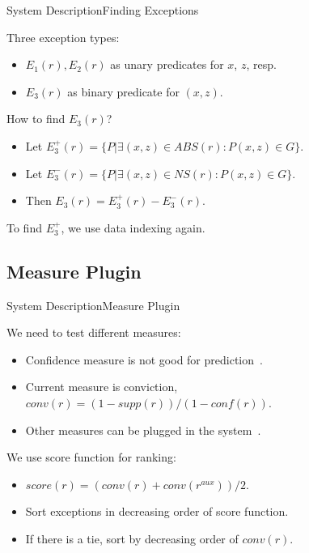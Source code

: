 \documentclass{beamer}
\begin{document}
\begin{frame}{System Description}{Finding Exceptions}

Three exception types:
\begin{itemize}
	\item $E_1(r), E_2(r)$ as unary predicates for $x$, $z$, resp.
	\item {
		$E_3(r)$ as binary predicate for $(x, z)$.
		\pause
	}
\end{itemize}

How to find $E_3(r)$?
\begin{itemize}
	\item Let $E_3^+(r) = \{P | \exists (x, z) \in ABS(r): P(x, z) \in G\}$.
	\item Let $E_3^-(r) = \{P | \exists (x, z) \in NS(r): P(x, z) \in G\}$.
	\item Then $E_3(r) = E_3^+(r) - E_3^-(r)$.
\end{itemize}

To find $E_3^+$, we use data indexing again.

\end{frame}

\subsection{Measure Plugin}

\begin{frame}{System Description}{Measure Plugin}

We need to test different measures:
\begin{itemize}
	\item Confidence measure is not good for prediction~\cite{ref1}.
	\item Current measure is conviction, $conv(r) = (1 - supp(r)) / (1 - conf(r))$.
	\item {
		Other measures can be plugged in the system~\cite{ref2}.
		\pause
	}
\end{itemize}

We use score function for ranking:
\begin{itemize}
	\item $score(r) = (conv(r) + conv(r^{aux})) / 2$.
	\item Sort exceptions in decreasing order of score function.
	\item If there is a tie, sort by decreasing order of $conv(r)$.
\end{itemize}

\end{frame}
\end{document}

